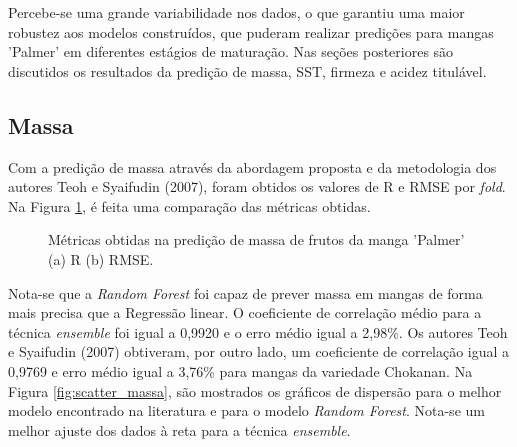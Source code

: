 Percebe-se uma grande variabilidade nos dados, o que garantiu uma maior robustez aos modelos construídos, que puderam realizar predições para mangas 'Palmer' em diferentes estágios de maturação. Nas seções posteriores são discutidos os resultados da predição de massa, SST, firmeza e acidez titulável. 

\subsection{Massa}

Com a predição de massa através da abordagem proposta e da metodologia dos autores Teoh e Syaifudin (2007), foram obtidos os valores de R e RMSE por \textit{fold}. Na Figura \ref{fig:massa_fold}, é feita uma comparação das métricas obtidas.

\begin{figure}[H]
	\centering
	\caption{Métricas obtidas na predição de massa de frutos da manga 'Palmer' (a) R (b) RMSE.}\label{fig:massa_fold}
\end{figure}

Nota-se que a \textit{Random Forest} foi capaz de prever massa em mangas de forma mais precisa que a Regressão linear. O coeficiente de correlação médio para a técnica \textit{ensemble} foi igual a 0,9920 e o erro médio igual a 2,98\%. Os autores Teoh e Syaifudin (2007) obtiveram, por outro lado, um coeficiente de correlação igual a 0,9769 e erro médio igual a 3,76\% para mangas da variedade Chokanan. 
Na Figura \ref{fig:scatter_massa}, são mostrados os gráficos de dispersão para o melhor modelo encontrado na literatura e para o modelo \textit{Random Forest}. Nota-se um melhor ajuste dos dados à reta para a técnica \textit{ensemble}.

